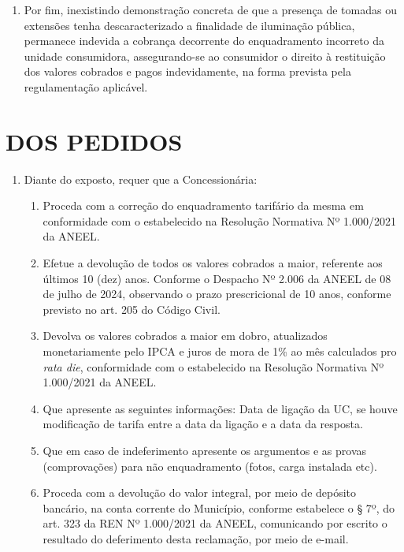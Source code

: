 \begin{enumerate}[resume]
\item Por fim, inexistindo demonstração concreta de que a presença de tomadas ou extensões tenha descaracterizado a finalidade de iluminação pública, permanece indevida a cobrança decorrente do enquadramento incorreto da unidade consumidora, assegurando-se ao consumidor o direito à restituição dos valores cobrados e pagos indevidamente, na forma prevista pela regulamentação aplicável.

\end{enumerate}


\section{DOS PEDIDOS}

\begin{enumerate}[resume]
\item 
Diante do exposto, requer que a Concessionária:

\begin{enumerate}
\item 
Proceda com a correção do enquadramento tarifário da mesma em conformidade com o estabelecido na Resolução Normativa Nº 1.000/2021 da ANEEL.
\item 
Efetue a devolução de todos os valores cobrados a maior, referente aos últimos 10 (dez) anos. Conforme o Despacho Nº 2.006 da ANEEL de 08 de julho de 2024, observando o prazo prescricional de 10 anos, conforme previsto no art. 205 do Código Civil.
\item 
Devolva os valores cobrados a maior em dobro, atualizados monetariamente pelo IPCA e juros de mora de 1\% ao mês calculados pro \textit{rata die}, conformidade com o estabelecido na Resolução Normativa Nº 1.000/2021 da ANEEL.   
\item 
Que apresente as seguintes informações: Data de ligação da UC, se houve modificação de tarifa entre a data da ligação e a data da resposta.   
\item 
Que em caso de indeferimento apresente os argumentos e as provas (comprovações) para não enquadramento (fotos, carga instalada etc).   
\item 
Proceda com a devolução do valor integral, por meio de depósito bancário, na conta corrente do Município, conforme estabelece o § 7º, do art. 323 da REN Nº 1.000/2021 da ANEEL, comunicando por escrito o resultado do deferimento desta reclamação, por meio de e-mail.

\end{enumerate}
\end{enumerate}